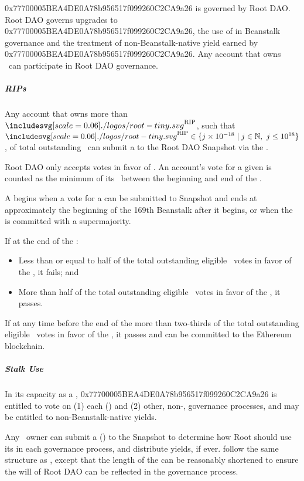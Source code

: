 \documentclass[class=article, crop=false]{standalone}
\begin{document}
0x77700005BEA4DE0A78b956517f099260C2CA9a26 is governed by Root DAO. Root DAO governs upgrades to 0x77700005BEA4DE0A78b956517f099260C2CA9a26, the use of  in Beanstalk governance and the treatment of non-Beanstalk-native yield earned by \newline0x77700005BEA4DE0A78b956517f099260C2CA9a26. Any account that owns \Root\ can participate in Root DAO governance.

\subparagraph{RIPs}

Any account that owns more than $\Root^{\text{RIP}}$, such that $\Root^{\text{RIP}} \in \{j \times 10^{-18} \mid j \in \mathbb{N},\ j \leq 10^{18} \}$, of total outstanding \Root\ can submit a  to the Root DAO Snapshot via the .

Root DAO only accepts votes in favor of . An account's vote for a given  is counted as the minimum of its \Root\ between the beginning and end of the . 

A  begins when a vote for a  can be submitted to Snapshot and ends at approximately the beginning of the 169th Beanstalk  after it begins, or when the  is committed with a supermajority.

If at the end of the :
\begin{itemize}[midsep]
    \item Less than or equal to half of the total outstanding eligible \Root\ votes in favor of the , it fails; and
    \item More than half of the total outstanding eligible \Root\ votes in favor of the , it passes.
\end{itemize}

If at any time before the end of the  more than two-thirds of the total outstanding eligible \Root\ votes in favor of the , it passes and can be committed to the Ethereum blockchain.

\subparagraph{Stalk Use}
In its capacity as a , 0x77700005BEA4DE0A78b956517f099260C2CA9a26 is entitled to vote on (1) each  () and (2) other, non-, governance processes, and may be entitled to non-Beanstalk-native yields.

Any \Root\ owner can submit a  () to the  Snapshot to determine how Root should use its  in each governance process, and distribute yields, if ever.  follow the same structure as , except that the length of the  can be reasonably shortened to ensure the will of Root DAO can be reflected in the governance process.
\end{document}
